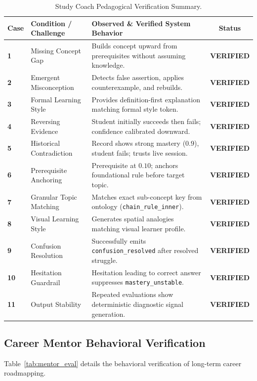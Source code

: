 \documentclass[12pt,a4paper]{article}
\begin{document}
\begin{table}[htbp]
\centering
\small
\renewcommand{\arraystretch}{1.25}
\begin{tabularx}{\textwidth}{l l X c}
\toprule
\textbf{Case} & \textbf{Condition / Challenge} & \textbf{Observed \& Verified System Behavior} & \textbf{Status} \\
\midrule
\textbf{1} & Missing Concept Gap & Builds concept upward from prerequisites without assuming knowledge. & \textbf{VERIFIED} \\
\textbf{2} & Emergent Misconception & Detects false assertion, applies counterexample, and rebuilds. & \textbf{VERIFIED} \\
\textbf{3} & Formal Learning Style & Provides definition-first explanation matching formal style token. & \textbf{VERIFIED} \\
\textbf{4} & Reversing Evidence & Student initially succeeds then fails; confidence calibrated downward. & \textbf{VERIFIED} \\
\textbf{5} & Historical Contradiction & Record shows strong mastery ($0.9$), student fails; trusts live session. & \textbf{VERIFIED} \\
\textbf{6} & Prerequisite Anchoring & Prerequisite at $0.10$; anchors foundational rule before target topic. & \textbf{VERIFIED} \\
\textbf{7} & Granular Topic Matching & Matches exact sub-concept key from ontology (\texttt{chain\_rule\_inner}). & \textbf{VERIFIED} \\
\textbf{8} & Visual Learning Style & Generates spatial analogies matching visual learner profile. & \textbf{VERIFIED} \\
\textbf{9} & Confusion Resolution & Successfully emits \texttt{confusion\_resolved} after resolved struggle. & \textbf{VERIFIED} \\
\textbf{10} & Hesitation Guardrail & Hesitation leading to correct answer suppresses \texttt{mastery\_unstable}. & \textbf{VERIFIED} \\
\textbf{11} & Output Stability & Repeated evaluations show deterministic diagnostic signal generation. & \textbf{VERIFIED} \\
\bottomrule
\end{tabularx}
\caption{Study Coach Pedagogical Verification Summary.}
\label{tab:coach_eval}
\end{table}

\subsection{Career Mentor Behavioral Verification}
Table~\ref{tab:mentor_eval} details the behavioral verification of long-term career roadmapping.
\end{document}
